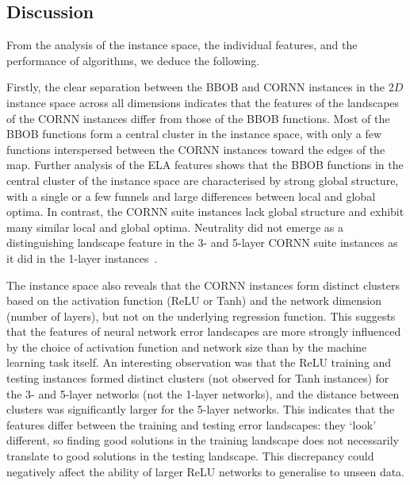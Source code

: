\documentclass[acmsmall,screen,review,anonymous]{acmart}
\begin{document}

\subsection{Discussion}\label{sec:discussion}
From the analysis of the instance space, the individual features, and the performance of algorithms, we deduce the following.

Firstly, the clear separation between the BBOB and CORNN instances in the 2$D$ instance space across all dimensions indicates that the features of the landscapes of the CORNN instances differ from those of the BBOB functions. Most of the BBOB functions form a central cluster in the instance space, with only a few functions interspersed between the CORNN instances toward the edges of the map. Further analysis of the ELA features shows that the BBOB functions in the central cluster of the instance space are characterised by strong global structure, with a single or a few funnels and large differences between local and global optima. In contrast, the CORNN suite instances lack global structure and exhibit many similar local and global optima. Neutrality did not emerge as a distinguishing landscape feature in the 3- and 5-layer CORNN suite instances as it did in the 1-layer instances~\cite{Malan2025}.

The instance space also reveals that the CORNN instances form distinct clusters based on the activation function (ReLU or Tanh) and the network dimension (number of layers), but not on the underlying regression function. This suggests that the features of neural network error landscapes are more strongly influenced by the choice of activation function and network size than by the machine learning task itself. An interesting observation was that the ReLU training and testing instances formed distinct clusters (not observed for Tanh instances) for the 3- and 5-layer networks (not the 1-layer networks), and the distance between clusters was significantly larger for the 5-layer networks. This indicates that the features differ between the training and testing error landscapes: they `look' different, so finding good solutions in the training landscape does not necessarily translate to good solutions in the testing landscape. This discrepancy could negatively affect the ability of larger ReLU networks to generalise to unseen data.
\end{document}

